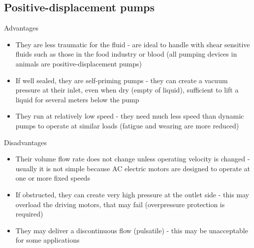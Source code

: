 \documentclass[class=report, crop=false, 12pt,a4paper]{standalone}
\begin{document}
\subsection{Positive-displacement pumps}
Advantages
\begin{itemize}
  \item They are less traumatic for the fluid - are ideal to handle with shear sensitive fluids such as those in the food industry or blood (all pumping devices in animals are positive-displacement pumps)
  \item If well sealed, they are self-priming pumps - they can create a vacuum pressure at their inlet, even when dry (empty of liquid), sufficient to lift a liquid for several meters below the pump
  \item They run at relatively low speed - they need much less speed than dynamic pumps to operate at similar loads (fatigue and wearing are more reduced)
\end{itemize}
Disadvantages
\begin{itemize}
  \item Their volume flow rate does not change unless operating velocity is changed - usually it is not simple because AC electric motors are designed to operate at one or more fixed speeds
  \item If obstructed, they can create very high pressure at the outlet side - this may overload the driving motors, that may fail (overpressure protection is required)
  \item They may deliver a discontinuous flow (pulsatile) - this may be unacceptable for some applications
\end{itemize}
\end{document}

